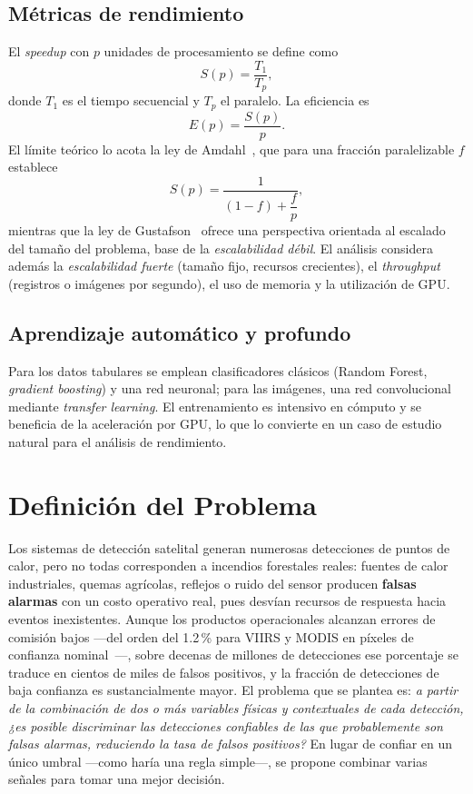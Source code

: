 \documentclass[conference]{IEEEtran}
\begin{document}
\subsection{Métricas de rendimiento}
El \textit{speedup} con $p$ unidades de procesamiento se define como
\begin{equation}
S(p) = \frac{T_1}{T_p},
\end{equation}
donde $T_1$ es el tiempo secuencial y $T_p$ el paralelo. La eficiencia es
\begin{equation}
E(p) = \frac{S(p)}{p}.
\end{equation}
El límite teórico lo acota la ley de Amdahl~\cite{amdahl1967}, que para una fracción paralelizable $f$ establece
\begin{equation}
S(p) = \frac{1}{(1-f) + \dfrac{f}{p}},
\label{eq:amdahl}
\end{equation}
mientras que la ley de Gustafson~\cite{gustafson1988} ofrece una perspectiva orientada al escalado del tamaño del problema, base de la \textit{escalabilidad débil}. El análisis considera además la \textit{escalabilidad fuerte} (tamaño fijo, recursos crecientes), el \textit{throughput} (registros o imágenes por segundo), el uso de memoria y la utilización de GPU.

\subsection{Aprendizaje automático y profundo}
Para los datos tabulares se emplean clasificadores clásicos (Random Forest, \textit{gradient boosting}) y una red neuronal; para las imágenes, una red convolucional mediante \textit{transfer learning}. El entrenamiento es intensivo en cómputo y se beneficia de la aceleración por GPU, lo que lo convierte en un caso de estudio natural para el análisis de rendimiento.

\section{Definición del Problema}
\label{sec:problema}
Los sistemas de detección satelital generan numerosas detecciones de puntos de calor, pero no todas corresponden a incendios forestales reales: fuentes de calor industriales, quemas agrícolas, reflejos o ruido del sensor producen \textbf{falsas alarmas} con un costo operativo real, pues desvían recursos de respuesta hacia eventos inexistentes. Aunque los productos operacionales alcanzan errores de comisión bajos —del orden del 1.2\,\% para VIIRS y MODIS en píxeles de confianza nominal~\cite{schroeder2014,giglio2016}—, sobre decenas de millones de detecciones ese porcentaje se traduce en cientos de miles de falsos positivos, y la fracción de detecciones de baja confianza es sustancialmente mayor. El problema que se plantea es: \textit{a partir de la combinación de dos o más variables físicas y contextuales de cada detección, ¿es posible discriminar las detecciones confiables de las que probablemente son falsas alarmas, reduciendo la tasa de falsos positivos?} En lugar de confiar en un único umbral —como haría una regla simple—, se propone combinar varias señales para tomar una mejor decisión.
\end{document}
